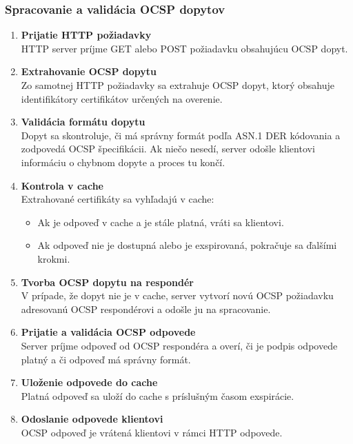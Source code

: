 \documentclass[12pt, twoside]{book}
\begin{document}
\subsubsection{Spracovanie a validácia OCSP dopytov}
\begin{enumerate}
\item \textbf{Prijatie HTTP požiadavky} \\
HTTP server príjme GET alebo POST požiadavku obsahujúcu OCSP dopyt.  

\item \textbf{Extrahovanie OCSP dopytu} \\
Zo samotnej HTTP požiadavky sa extrahuje OCSP dopyt, ktorý obsahuje identifikátory certifikátov určených na overenie. 

\item \textbf{Validácia formátu dopytu} \\ 
Dopyt sa skontroluje, či má správny formát podľa ASN.1 DER kódovania a zodpovedá OCSP špecifikácii. Ak niečo nesedí, server odošle klientovi informáciu o chybnom dopyte a proces tu končí.

\item \textbf{Kontrola v cache} \\ 
Extrahované certifikáty sa vyhľadajú v cache:  
	
	\begin{itemize}
	\item Ak je odpoveď v cache a je stále platná, vráti sa klientovi.  
	\item Ak odpoveď nie je dostupná alebo je exspirovaná, pokračuje sa ďalšími krokmi.  
	\end{itemize}  

\item \textbf{Tvorba OCSP dopytu na respondér} \\ 
V prípade, že dopyt nie je v cache, server vytvorí novú OCSP požiadavku adresovanú OCSP respondérovi a odošle ju na spracovanie.  

\item \textbf{Prijatie a validácia OCSP odpovede} \\ 
Server príjme odpoveď od OCSP respondéra a overí, či je podpis odpovede platný a či odpoveď má správny formát.  

\item \textbf{Uloženie odpovede do cache} \\ 
Platná odpoveď sa uloží do cache s príslušným časom exspirácie.  

\item \textbf{Odoslanie odpovede klientovi} \\ 
OCSP odpoveď je vrátená klientovi v rámci HTTP odpovede.  
\end{enumerate}
\end{document}
